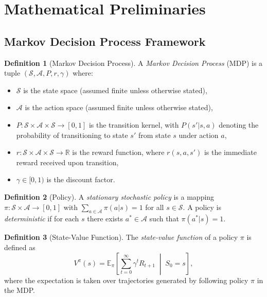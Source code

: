 \documentclass[11pt,a4paper]{article}
\theoremstyle{definition}
\newtheorem{definition}{Definition}[section]
\theoremstyle{plain}
\theoremstyle{remark}
\newcommand{\E}{\mathbb{E}}
\newcommand{\R}{\mathbb{R}}
\begin{document}
\section{Mathematical Preliminaries}
\label{sec:preliminaries}

\subsection{Markov Decision Process Framework}
\label{subsec:mdp}

\begin{definition}[Markov Decision Process]
\label{def:mdp}
A \emph{Markov Decision Process} (MDP) is a tuple $(\mathcal{S}, \mathcal{A}, P, r, \gamma)$ where:
\begin{itemize}[nosep]
    \item $\mathcal{S}$ is the state space (assumed finite unless otherwise stated),
    \item $\mathcal{A}$ is the action space (assumed finite unless otherwise stated),
    \item $P: \mathcal{S} \times \mathcal{A} \times \mathcal{S} \to [0,1]$ is the transition kernel, with $P(s'|s,a)$ denoting the probability of transitioning to state $s'$ from state $s$ under action $a$,
    \item $r: \mathcal{S} \times \mathcal{A} \times \mathcal{S} \to \R$ is the reward function, where $r(s,a,s')$ is the immediate reward received upon transition,
    \item $\gamma \in [0,1)$ is the discount factor.
\end{itemize}
\end{definition}

\begin{definition}[Policy]
\label{def:policy}
A \emph{stationary stochastic policy} is a mapping $\pi: \mathcal{S} \times \mathcal{A} \to [0,1]$ with $\sum_{a \in \mathcal{A}} \pi(a|s) = 1$ for all $s \in \mathcal{S}$. A policy is \emph{deterministic} if for each $s$ there exists $a^* \in \mathcal{A}$ such that $\pi(a^*|s) = 1$.
\end{definition}

\begin{definition}[State-Value Function]
\label{def:state_value}
The \emph{state-value function} of a policy $\pi$ is defined as
\begin{equation}
    V^\pi(s) = \E_\pi\!\left[\sum_{t=0}^{\infty} \gamma^t R_{t+1} \;\middle|\; S_0 = s\right],
    \label{eq:state_value}
\end{equation}
where the expectation is taken over trajectories generated by following policy $\pi$ in the MDP.
\end{definition}
\end{document}
